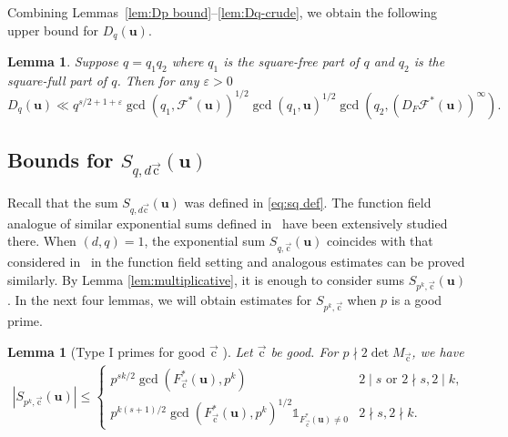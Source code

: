 \documentclass[letterpaper,11pt]{amsart}
\numberwithin{equation}{section}
\newtheorem{lemma}[theorem]{Lemma}
\theoremstyle{definition}
\numberwithin{equation}{section}
\newcommand{\uu}{\mathbf{u}}
\newcommand{\uc}{{\vec{\mathrm{c}}}}
\def\scrF{{\mathcal F}}
\begin{document}
Combining Lemmas~\ref{lem:Dp bound}--\ref{lem:Dq-crude}, we obtain the following upper bound for $D_q(\uu)$.
\begin{lemma}\label{lem:Dqfinal}
	Suppose \(q=q_1q_2\) where $q_1$ is the square-free part of $q$ and $q_2$ is the square-full part of $q$.  Then for any $\varepsilon>0$
	\[
	D_q(\uu)\ll q^{s/2+1+\varepsilon}
	\gcd(q_1,\scrF^*(\uu))^{1/2}
	\gcd(q_1, \uu)^{1/2}\gcd(q_2,(D_F\scrF^*(\uu))^\infty)
	.
	\]
\end{lemma}

\subsection{Bounds for $S_{q,d\uc}(\uu)$}

Recall  that the sum $S_{q, d\uc}(\uu)$ was defined in  \eqref{eq:sq def}.
The function field analogue of similar exponential sums defined in~\cite[eq. (6.1)]{V19} have been extensively studied there.
When $(d,q)=1$, the exponential sum $S_{q, \uc}(\uu)$ coincides with that considered in~\cite[Section 6]{V19} in the function field setting and analogous estimates can be proved similarly. By Lemma \ref{lem:multiplicative}, it is enough to consider sums $S_{p^k,\uc}(\uu)$. In the next four lemmas, we will obtain estimates for $S_{p^k, \uc}$ when $p$ is a good prime.
\begin{lemma}[Type I primes for good $\uc$ ]\label{lem:type 1} Let $\uc$ be good. 
For $p\nmid 2\det M_{\uc}$, we have
	\begin{align*}
	|S_{p^k, \uc}(\uu)|\leq\begin{cases}
	p^{sk/2}\gcd(F_\uc^*(\uu), p^{k}) & 2\mid s \text{ or } 2\nmid s, 2\mid k,\\ 
	p^{k(s+1)/2}\gcd (F_\uc^*(\uu), p^{k})^{1/2}\mathds {1}_{F_{\uc}^*(\uu)\not=0} & 2\nmid s, 2\nmid k.
	\end{cases}
	\end{align*}
\end{lemma}
\end{document}

